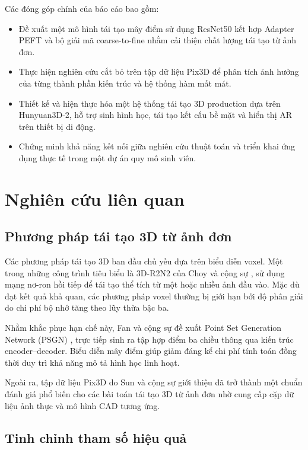 \documentclass[conference,a4paper]{IEEEtran}
\begin{document}
Các đóng góp chính của báo cáo bao gồm:

\begin{itemize}
    \item Đề xuất một mô hình tái tạo mây điểm sử dụng ResNet50 kết hợp Adapter PEFT và bộ giải mã coarse-to-fine nhằm cải thiện chất lượng tái tạo từ ảnh đơn.

    \item Thực hiện nghiên cứu cắt bỏ trên tập dữ liệu Pix3D để phân tích ảnh hưởng của từng thành phần kiến trúc và hệ thống hàm mất mát.

    \item Thiết kế và hiện thực hóa một hệ thống tái tạo 3D production dựa trên Hunyuan3D-2, hỗ trợ sinh hình học, tái tạo kết cấu bề mặt và hiển thị AR trên thiết bị di động.

    \item Chứng minh khả năng kết nối giữa nghiên cứu thuật toán và triển khai ứng dụng thực tế trong một dự án quy mô sinh viên.
\end{itemize}

\section{Nghiên cứu liên quan}

\subsection{Phương pháp tái tạo 3D từ ảnh đơn}

Các phương pháp tái tạo 3D ban đầu chủ yếu dựa trên biểu diễn voxel. Một trong những công trình tiêu biểu là 3D-R2N2 của Choy và cộng sự \cite{choy}, sử dụng mạng nơ-ron hồi tiếp để tái tạo thể tích từ một hoặc nhiều ảnh đầu vào. Mặc dù đạt kết quả khả quan, các phương pháp voxel thường bị giới hạn bởi độ phân giải do chi phí bộ nhớ tăng theo lũy thừa bậc ba.

Nhằm khắc phục hạn chế này, Fan và cộng sự đề xuất Point Set Generation Network (PSGN) \cite{fan}, trực tiếp sinh ra tập hợp điểm ba chiều thông qua kiến trúc encoder--decoder. Biểu diễn mây điểm giúp giảm đáng kể chi phí tính toán đồng thời duy trì khả năng mô tả hình học linh hoạt.

Ngoài ra, tập dữ liệu Pix3D do Sun và cộng sự giới thiệu \cite{sun} đã trở thành một chuẩn đánh giá phổ biến cho các bài toán tái tạo 3D từ ảnh đơn nhờ cung cấp cặp dữ liệu ảnh thực và mô hình CAD tương ứng.

\subsection{Tinh chỉnh tham số hiệu quả}
\end{document}
